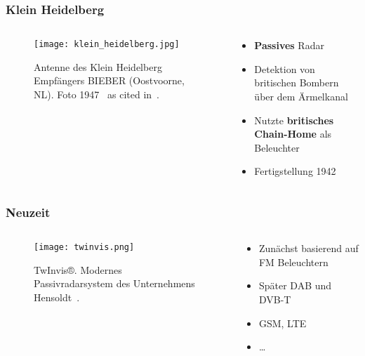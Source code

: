 \begin{frame}
    \frametitle{Klein Heidelberg}

    \begin{columns}
        \begin{column}{0.44\textwidth}
            \begin{figure}
                \centering
                \texttt{[image: klein\_heidelberg.jpg]}
                \caption{Antenne des Klein Heidelberg Empfängers BIEBER (Oostvoorne, NL). Foto 1947~\cite{Rijpsma2005} as cited in~\cite{Griffiths2010}.}
            \end{figure}
        \end{column}
        \begin{column}{0.56\textwidth}
            \begin{itemize}
                \item \textbf{Passives} Radar
                \item Detektion von britischen Bombern über dem Ärmelkanal
                \item Nutzte \textbf{britisches Chain-Home} als Beleuchter
                \item Fertigstellung 1942
            \end{itemize}
        \end{column}
    \end{columns}
\end{frame}

\begin{frame}
    \frametitle{Neuzeit}

    \begin{columns}
        \begin{column}{0.55\textwidth}
            \begin{figure}
                \centering
                \texttt{[image: twinvis.png]}
                \caption{TwInvis®. Modernes Passivradarsystem des Unternehmens Hensoldt~\cite{Hensoldt2019}.}
            \end{figure}
        \end{column}
        \begin{column}{0.45\textwidth}
            \begin{itemize}
                \item Zunächst basierend auf FM Beleuchtern
                \item Später DAB und DVB-T
                \item GSM, LTE
                \item \dots
            \end{itemize}
        \end{column}
    \end{columns}
\end{frame}
